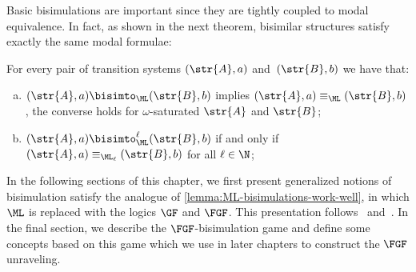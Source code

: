 \noindent
Basic bisimulations are important since they are tightly coupled to modal equivalence.
In fact, as shown in the next theorem, bisimilar structures satisfy exactly the same modal formulae:
\begin{lemma}\label{lemma:ML-bisimulations-work-well}
For every pair of transition systems $(\str{A}, a)$ and~$(\str{B}, b)$ we have that:
\begin{enumerate}[(a)]
\item $(\str{A}, a) \bisimto_{\ML} (\str{B}, b)$ implies $(\str{A}, a) \equiv_{\ML} (\str{B}, b)$, the converse holds for $\omega$-saturated $\str{A}$ and $\str{B}$;
\item $(\str{A}, a) \bisimto_{\ML}^{\ell} (\str{B}, b)$ if and only if $(\str{A}, a) \equiv_{\ML_\ell} (\str{B}, b)$ for all $\ell \in \N$;
\end{enumerate}
\end{lemma}
In the following sections of this chapter, we first present generalized notions of bisimulation satisfy the analogue of \cref{lemma:ML-bisimulations-work-well}, in which $\ML$ is replaced with the logics $\GF$ and $\FGF$.
This presentation follows~\cite[Sec. 2.2.3]{Otto04} and~\cite[Sec. 2]{BednarczykJ22}.
In the final section, we describe the $\FGF$-bisimulation game and define some concepts based on this game which we use in later chapters to construct the $\FGF$ unraveling.

